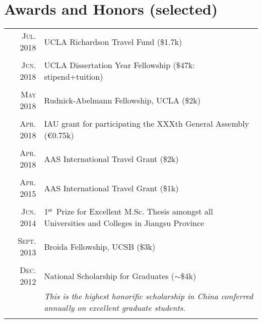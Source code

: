 \documentclass[letterpaper,11pt]{article}
\newcommand{\narrow}{-1.8ex}
\begin{document}
\section{Awards and Honors (selected)}
\begin{tabular}{r|p{5.6in}}
    \textsc{Jul. 2018} & UCLA Richardson Travel Fund (\$1.7k)   \\
    \multicolumn{2}{c}{} \\[\narrow]
    \textsc{Jun. 2018} & UCLA Dissertation Year Fellowship (\$47k: stipend+tuition)    \\
    \multicolumn{2}{c}{} \\[\narrow]
    \textsc{May 2018} & Rudnick-Abelmann Fellowship, UCLA (\$2k)      \\
    \multicolumn{2}{c}{} \\[\narrow]
    \textsc{Apr. 2018} & IAU grant for participating the XXXth General Assembly (\euro0.75k)  \\
    \multicolumn{2}{c}{} \\[\narrow]
    \textsc{Apr. 2018} & AAS International Travel Grant (\$2k)    \\
    \multicolumn{2}{c}{} \\[\narrow]
    \textsc{Apr. 2015} & AAS International Travel Grant (\$1k)    \\
    \multicolumn{2}{c}{} \\[\narrow]
    \textsc{Jun. 2014} & 1$^{\rm st}$ Prize for Excellent M.Sc. Thesis amongst all Universities and Colleges in Jiangsu Province   \\
    \multicolumn{2}{c}{} \\[\narrow]
    \textsc{Sept. 2013} & Broida Fellowship, UCSB (\$3k)  \\
    \multicolumn{2}{c}{} \\[\narrow]
    \textsc{Dec. 2012} & National Scholarship for Graduates ($\sim$\$4k)  \\
                     & {\it\small This is the highest honorific scholarship in China conferred annually on excellent graduate students.}\\
    \multicolumn{2}{c}{} \\[\narrow]

\end{tabular}
\end{document}
